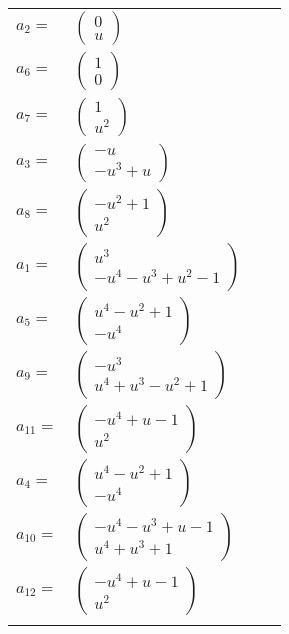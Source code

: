 \documentclass[1p]{elsarticle_modified}
\theoremstyle{definition}
\begin{document}
\begin{tabular}{m{7pt} m{180pt} m{7pt} m{180pt} }
\flushright $a_{2}=$&$\begin{pmatrix}0\\u\end{pmatrix}$ \\
\flushright $a_{6}=$&$\begin{pmatrix}1\\0\end{pmatrix}$ \\
\flushright $a_{7}=$&$\begin{pmatrix}1\\u^2\end{pmatrix}$ \\
\flushright $a_{3}=$&$\begin{pmatrix}- u\\- u^3+u\end{pmatrix}$ \\
\flushright $a_{8}=$&$\begin{pmatrix}- u^2+1\\u^2\end{pmatrix}$ \\
\flushright $a_{1}=$&$\begin{pmatrix}u^3\\- u^4- u^3+u^2-1\end{pmatrix}$ \\
\flushright $a_{5}=$&$\begin{pmatrix}u^4- u^2+1\\- u^4\end{pmatrix}$ \\
\flushright $a_{9}=$&$\begin{pmatrix}- u^3\\u^4+u^3- u^2+1\end{pmatrix}$ \\
\flushright $a_{11}=$&$\begin{pmatrix}- u^4+u-1\\u^2\end{pmatrix}$ \\
\flushright $a_{4}=$&$\begin{pmatrix}u^4- u^2+1\\- u^4\end{pmatrix}$ \\
\flushright $a_{10}=$&$\begin{pmatrix}- u^4- u^3+u-1\\u^4+u^3+1\end{pmatrix}$ \\
\flushright $a_{12}=$&$\begin{pmatrix}- u^4+u-1\\u^2\end{pmatrix}$\\&\end{tabular}
\end{document}
